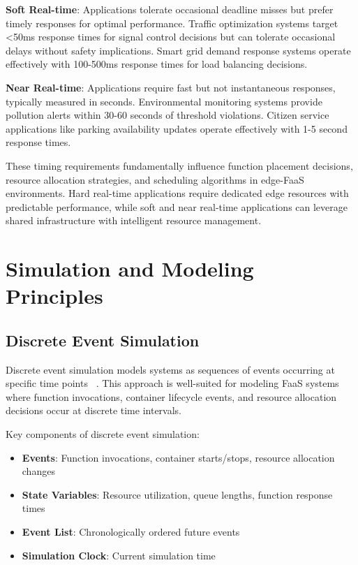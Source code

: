\textbf{Soft Real-time}: Applications tolerate occasional deadline misses but prefer timely responses for optimal performance. Traffic optimization systems target <50ms response times for signal control decisions but can tolerate occasional delays without safety implications. Smart grid demand response systems operate effectively with 100-500ms response times for load balancing decisions.

\textbf{Near Real-time}: Applications require fast but not instantaneous responses, typically measured in seconds. Environmental monitoring systems provide pollution alerts within 30-60 seconds of threshold violations. Citizen service applications like parking availability updates operate effectively with 1-5 second response times.

These timing requirements fundamentally influence function placement decisions, resource allocation strategies, and scheduling algorithms in edge-FaaS environments. Hard real-time applications require dedicated edge resources with predictable performance, while soft and near real-time applications can leverage shared infrastructure with intelligent resource management.

\section{Simulation and Modeling Principles}

\subsection{Discrete Event Simulation}

Discrete event simulation models systems as sequences of events occurring at specific time points ~\cite{mahmoudi2021simfaas}. This approach is well-suited for modeling FaaS systems where function invocations, container lifecycle events, and resource allocation decisions occur at discrete time intervals.

Key components of discrete event simulation:
\begin{itemize}
    \item \textbf{Events}: Function invocations, container starts/stops, resource allocation changes
    \item \textbf{State Variables}: Resource utilization, queue lengths, function response times
    \item \textbf{Event List}: Chronologically ordered future events
    \item \textbf{Simulation Clock}: Current simulation time
\end{itemize}

